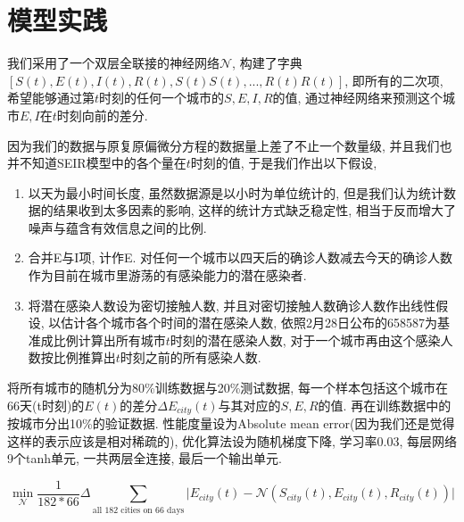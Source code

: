 \documentclass[lang=cn,11pt]{elegantpaper}
\begin{document}
\section{模型实践}

我们采用了一个双层全联接的神经网络$\mathcal N$, 构建了字典$[S(t),E(t),I(t),R(t),S(t)S(t),...,R(t)R(t)]$, 即所有的二次项, 希望能够通过第$t$时刻的任何一个城市的$S,E,I,R$的值, 通过神经网络来预测这个城市$E,I$在$t$时刻向前的差分. 

因为我们的数据与原复原偏微分方程的数据量上差了不止一个数量级, 并且我们也并不知道SEIR模型中的各个量在$t$时刻的值, 于是我们作出以下假设, 
\begin{enumerate}
	\item 以天为最小时间长度, 虽然数据源是以小时为单位统计的, 但是我们认为统计数据的结果收到太多因素的影响, 这样的统计方式缺乏稳定性, 相当于反而增大了噪声与蕴含有效信息之间的比例.
	\item 合并E与I项, 计作E. 对任何一个城市以四天后的确诊人数减去今天的确诊人数作为目前在城市里游荡的有感染能力的潜在感染者.
	\item 将潜在感染人数设为密切接触人数, 并且对密切接触人数确诊人数作出线性假设, 以估计各个城市各个时间的潜在感染人数, 依照2月28日公布的658587为基准成比例计算出所有城市$t$时刻的潜在感染人数, 对于一个城市再由这个感染人数按比例推算出$t$时刻之前的所有感染人数. 
\end{enumerate}

将所有城市的随机分为80\%训练数据与20\%测试数据, 每一个样本包括这个城市在66天(t时刻)的$E(t)$的差分$\Delta E_{city}(t)$与其对应的$S,E,R$的值. 再在训练数据中的按城市分出10\%的验证数据. 性能度量设为Absolute mean error(因为我们还是觉得这样的表示应该是相对稀疏的), 优化算法设为随机梯度下降, 学习率0.03, 每层网络9个tanh单元, 一共两层全连接, 最后一个输出单元.

\begin{equation}
	\min_{\mathcal N} \dfrac{1}{182*66}\Delta \sum_{\text{all 182 cities on 66 days}}\Big|E_{city}(t)-\mathcal N(S_{city}(t),E_{city}(t),R_{city}(t))\Big|
\end{equation}



\newpage



\end{document}
